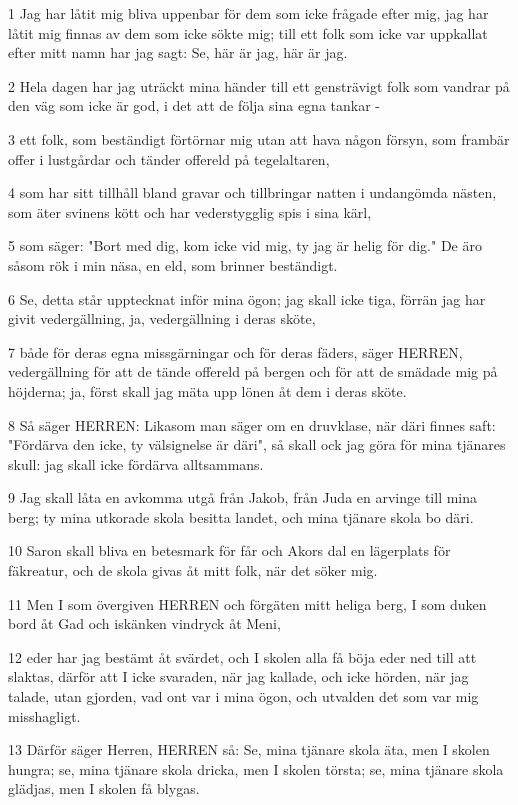 \par 1 Jag har låtit mig bliva uppenbar för dem som icke frågade efter mig, jag har låtit mig finnas av dem som icke sökte mig; till ett folk som icke var uppkallat efter mitt namn har jag sagt: Se, här är jag, här är jag.
\par 2 Hela dagen har jag uträckt mina händer till ett gensträvigt folk som vandrar på den väg som icke är god, i det att de följa sina egna tankar -
\par 3 ett folk, som beständigt förtörnar mig utan att hava någon försyn, som frambär offer i lustgårdar och tänder offereld på tegelaltaren,
\par 4 som har sitt tillhåll bland gravar och tillbringar natten i undangömda nästen, som äter svinens kött och har vederstygglig spis i sina kärl,
\par 5 som säger: "Bort med dig, kom icke vid mig, ty jag är helig för dig." De äro såsom rök i min näsa, en eld, som brinner beständigt.
\par 6 Se, detta står upptecknat inför mina ögon; jag skall icke tiga, förrän jag har givit vedergällning, ja, vedergällning i deras sköte,
\par 7 både för deras egna missgärningar och för deras fäders, säger HERREN, vedergällning för att de tände offereld på bergen och för att de smädade mig på höjderna; ja, först skall jag mäta upp lönen åt dem i deras sköte.
\par 8 Så säger HERREN: Likasom man säger om en druvklase, när däri finnes saft: "Fördärva den icke, ty välsignelse är däri", så skall ock jag göra för mina tjänares skull: jag skall icke fördärva alltsammans.
\par 9 Jag skall låta en avkomma utgå från Jakob, från Juda en arvinge till mina berg; ty mina utkorade skola besitta landet, och mina tjänare skola bo däri.
\par 10 Saron skall bliva en betesmark för får och Akors dal en lägerplats för fäkreatur, och de skola givas åt mitt folk, när det söker mig.
\par 11 Men I som övergiven HERREN och förgäten mitt heliga berg, I som duken bord åt Gad och iskänken vindryck åt Meni,
\par 12 eder har jag bestämt åt svärdet, och I skolen alla få böja eder ned till att slaktas, därför att I icke svaraden, när jag kallade, och icke hörden, när jag talade, utan gjorden, vad ont var i mina ögon, och utvalden det som var mig misshagligt.
\par 13 Därför säger Herren, HERREN så: Se, mina tjänare skola äta, men I skolen hungra; se, mina tjänare skola dricka, men I skolen törsta; se, mina tjänare skola glädjas, men I skolen få blygas.
